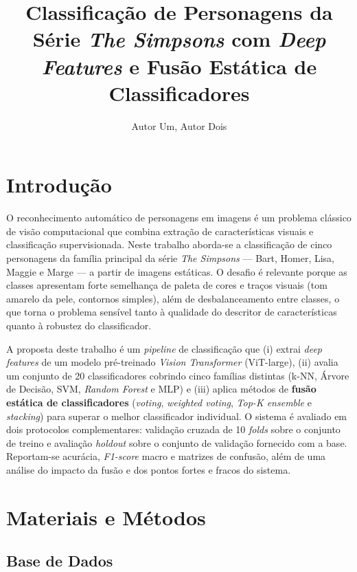 \documentclass[12pt]{article}
\title{Classificação de Personagens da Série \textit{The Simpsons} com
\textit{Deep Features} e Fusão Estática de Classificadores}
\author{Autor Um\inst{1}, Autor Dois\inst{1}}
\begin{document}
\maketitle

\section{Introdução}

O reconhecimento automático de personagens em imagens é um problema clássico
de visão computacional que combina extração de características visuais e
classificação supervisionada. Neste trabalho aborda-se a classificação de cinco
personagens da família principal da série \textit{The Simpsons} --- Bart, Homer,
Lisa, Maggie e Marge --- a partir de imagens estáticas. O desafio é relevante
porque as classes apresentam forte semelhança de paleta de cores e traços
visuais (tom amarelo da pele, contornos simples), além de desbalanceamento entre
classes, o que torna o problema sensível tanto à qualidade do descritor de
características quanto à robustez do classificador.

A proposta deste trabalho é um \textit{pipeline} de classificação que (i) extrai
\textit{deep features} de um modelo pré-treinado \textit{Vision Transformer}
(ViT-large), (ii) avalia um conjunto de 20 classificadores cobrindo cinco
famílias distintas (k-NN, Árvore de Decisão, SVM, \textit{Random Forest} e MLP)
e (iii) aplica métodos de \textbf{fusão estática de classificadores}
(\textit{voting}, \textit{weighted voting}, \textit{Top-K ensemble} e
\textit{stacking}) para superar o melhor classificador individual. O sistema é
avaliado em dois protocolos complementares: validação cruzada de 10
\textit{folds} sobre o conjunto de treino e avaliação \textit{holdout} sobre o
conjunto de validação fornecido com a base. Reportam-se acurácia, \textit{F1-score}
macro e matrizes de confusão, além de uma análise do impacto da fusão e dos
pontos fortes e fracos do sistema.

\section{Materiais e Métodos}

\subsection{Base de Dados}
\end{document}
